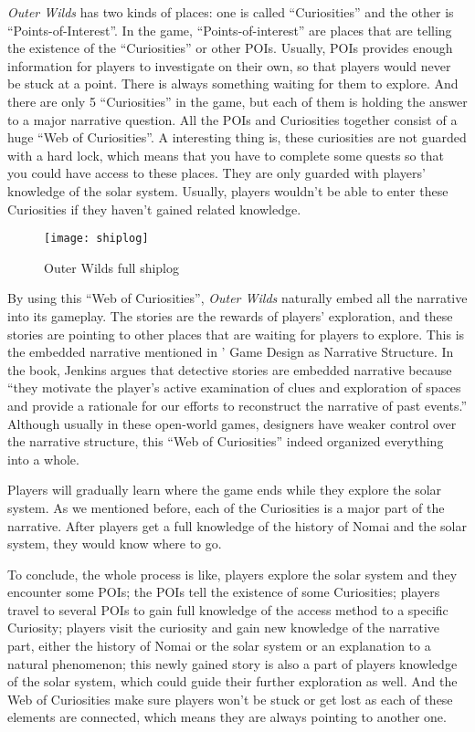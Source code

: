 \documentclass[mla7]{mla}
\begin{document}
\textit{Outer Wilds} has two kinds of places: one is called ``Curiosities'' and
the other is ``Points-of-Interest''. In the game, ``Points-of-interest'' are
places that are telling the existence of the ``Curiosities'' or other
POIs. Usually, POIs provides enough information for players to investigate on
their own, so that players would never be stuck at a point. There is always
something waiting for them to explore. And there are only 5 ``Curiosities'' in
the game, but each of them is holding the answer to a major narrative
question. All the POIs and Curiosities together consist of a huge ``Web of
Curiosities''. A interesting thing is, these curiosities are not guarded with a
hard lock, which means that you have to complete some quests so that you could
have access to these places. They are only guarded with players' knowledge of
the solar system. Usually, players wouldn't be able to enter these Curiosities
if they haven't gained related knowledge.

\begin{figure}[h]
\centering
\texttt{[image: shiplog]}
\caption{Outer Wilds full shiplog}
\end{figure}

By using this ``Web of Curiosities'', \textit{Outer Wilds} naturally embed all
the narrative into its gameplay. The stories are the rewards of players'
exploration, and these stories are pointing to other places that are waiting for
players to explore. This is the embedded narrative mentioned in
\cite{jenkins2004game}' Game Design as Narrative Structure. In the book,
Jenkins argues that detective stories are embedded narrative because ``they
motivate the player's active examination of clues and exploration of spaces and
provide a rationale for our efforts to reconstruct the narrative of past
events.'' Although usually in these open-world games, designers have weaker
control over the narrative structure, this ``Web of Curiosities'' indeed
organized everything into a whole.

Players will gradually learn where the game ends while they explore the solar
system. As we mentioned before, each of the Curiosities is a major part of the
narrative. After players get a full knowledge of the history of Nomai and the
solar system, they would know where to go.

To conclude, the whole process is like, players explore the solar system and
they encounter some POIs; the POIs tell the existence of some Curiosities;
players travel to several POIs to gain full knowledge of the access method to a
specific Curiosity; players visit the curiosity and gain new knowledge of the
narrative part, either the history of Nomai or the solar system or an
explanation to a natural phenomenon; this newly gained story is also a part of
players knowledge of the solar system, which could guide their further
exploration as well. And the Web of Curiosities make sure players won't be
stuck or get lost as each of these elements are connected, which means they are
always pointing to another one.
\end{document}
